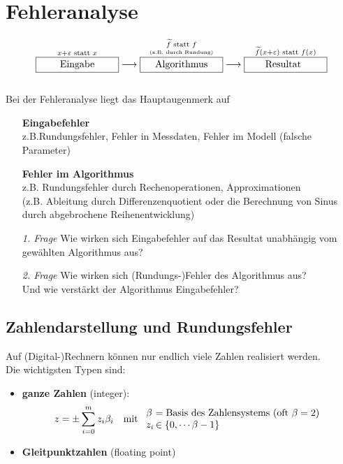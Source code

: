 \documentclass[ngerman,fontsize=11pt, paper=a4, parskip=half, titlepage=true, toc=bib]{scrbook}
\theoremstyle{definition}
\theoremstyle{plain}
\newcommand{\sectione}[1]{ \setcounter{equation}{0}\section{#1}}
\begin{document}
\chapter{Fehleranalyse} \label{3}
% 
\begin{align*}
  \overset{x+\varepsilon \text{ statt } x}{\framebox[3cm]{Eingabe}} \longrightarrow 
  \overset{\underset{\text{\tiny (z.B. durch Rundung)}}{\widetilde{f} \text{ statt } f}}{\framebox[3cm]{Algorithmus}} \longrightarrow
  \overset{\widetilde{f}(x+\varepsilon) \text{ statt } f(x)}{\framebox[3cm]{Resultat\phantom{g}}}
\end{align*}\\

Bei der Fehleranalyse liegt das Hauptaugenmerk auf
\begin{itemize}
\item[] \textbf{Eingabefehler}\\ z.B.Rundungsfehler, Fehler in Messdaten, Fehler im Modell (falsche Parameter)
\item[] \textbf{Fehler im Algorithmus} \\ z.B. Rundungsfehler durch Rechenoperationen, Approximationen \\
  (z.B. Ableitung durch Differenzenquotient oder die Berechnung von Sinus durch abgebrochene Reihenentwicklung)
  \\
\item[\textit{1. Frage}] Wie wirken sich Eingabefehler auf das Resultat unabhängig vom gewählten Algorithmus aus?
\item[\textit{2. Frage}]Wie wirken sich (Rundungs-)Fehler des Algorithmus aus?\\
  Und wie verstärkt der Algorithmus Eingabefehler?
\end{itemize}


\sectione{Zahlendarstellung und Rundungsfehler} \label{3.1}  
Auf (Digital-)Rechnern können nur endlich viele Zahlen realisiert werden. \\
Die wichtigsten Typen sind: 
\begin{itemize}
\item \textbf{ganze Zahlen}  (integer):
  \begin{align*}
    z&=\pm \sum_{i=0}^{m}z_i\beta_i & \text{mit }
                                      \begin{array}{l@{\,}l}
                                        \beta &= \text{Basis des Zahlensystems (oft $\beta=2$)} \\
                                        z_i &\in \{0, \cdots \beta-1\}
                                      \end{array}
  \end{align*}
\item \textbf{Gleitpunktzahlen} (floating point) 
\end{itemize}
\end{document}
